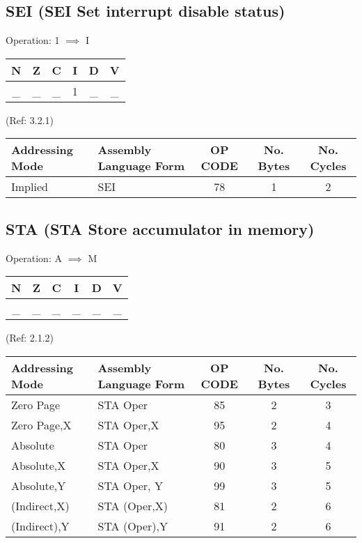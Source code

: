 \documentclass{article}
\begin{document}
  \subsection{SEI (SEI Set interrupt disable status)}
  Operation:  1 $\implies$ I
  \begin{table}[H]
  \centering
  \begin{tabular}{|c c c c c c|}
  \hline
  N&Z&C&I&D&V\\
  \hline
  \_ & \_ & \_ & 1 & \_ & \_\\
  \hline
  \end{tabular}
  \end{table}
                                (Ref: 3.2.1)
  \begin{table}[H]
  \centering
  \begin{tabular}{|l|l|c|c|c|}
  \hline
    Addressing Mode& Assembly Language Form& OP CODE &No. Bytes&No. Cycles\\
  \hline
     Implied       &   SEI                 &    78   &    1    &    2     \\
  \hline
  \end{tabular}
  \end{table}


  \subsection{STA (STA Store accumulator in memory)}
  Operation:  A $\implies$ M
  \begin{table}[H]
  \centering
  \begin{tabular}{|c c c c c c|}
  \hline
  N&Z&C&I&D&V\\
  \hline
  \_ & \_ & \_ & \_ & \_ & \_\\
  \hline
  \end{tabular}
  \end{table}
                                (Ref: 2.1.2)
  \begin{table}[H]
  \centering
  \begin{tabular}{|l|l|c|c|c|}
  \hline
    Addressing Mode& Assembly Language Form& OP CODE &No. Bytes&No. Cycles\\
  \hline
     Zero Page     &   STA Oper            &    85   &    2    &    3     \\
     Zero Page,X   &   STA Oper,X          &    95   &    2    &    4     \\
     Absolute      &   STA Oper            &    80   &    3    &    4     \\
     Absolute,X    &   STA Oper,X          &    90   &    3    &    5     \\
     Absolute,Y    &   STA Oper, Y         &    99   &    3    &    5     \\
     (Indirect,X)  &   STA (Oper,X)        &    81   &    2    &    6     \\
     (Indirect),Y  &   STA (Oper),Y        &    91   &    2    &    6     \\
  \hline
  \end{tabular}
  \end{table}
\end{document}
